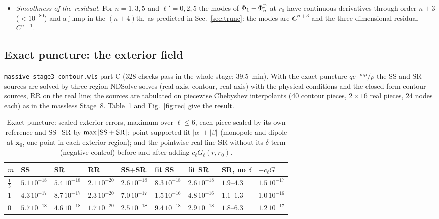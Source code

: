 \documentclass[11pt,a4paper]{article}
\newcommand{\x}{\mathbf{x}}
\newcommand{\code}[1]{\texttt{#1}}
\newcommand{\PhiP}{\Phi^{\rm P}}
\begin{document}
\begin{itemize}[leftmargin=*]
\item \emph{Smoothness of the residual.} For $n=1,3,5$ and $\ell'=0,2,5$ the modes of $\Phi_1-\PhiP_n$ at $r_0$ have continuous derivatives through order $n+3$ ($<10^{-80}$) and a jump in the $(n+4)$th, as predicted in Sec.~\ref{sec:trunc}: the modes are $C^{n+3}$ and the three-dimensional residual $C^{n+1}$.
\end{itemize}

\subsection{Exact puncture: the exterior field}\label{sec:exact}
\code{massive\_stage3\_\allowbreak contour.wls} part C (328 checks pass in the whole stage; 39.5~min).
With the exact puncture $qe^{-m\rho}/\rho$ the SS and SR sources are solved by three-region NDSolve solves (real axis, contour, real axis) with the physical conditions and the closed-form contour sources, RR on the real line; the sources are tabulated on piecewise Chebyshev interpolants (40 contour pieces, $2\times16$ real pieces, 24 nodes each) as in the massless Stage~8.
Table~\ref{tab:exact} and Fig.~\ref{fig:rec} give the result.

\begin{table}[h]
\centering
\caption{Exact puncture: scaled exterior errors, maximum over $\ell\le6$, each piece scaled by its own reference and SS$+$SR by $\max|{\rm SS}+{\rm SR}|$; point-supported fit $|\alpha|+|\beta|$ (monopole and dipole at $\x_0$, one point in each exterior region); and the pointwise real-line SR without its $\delta$ term (negative control) before and after adding $c_\ell G_\ell(r,r_0)$.}
\label{tab:exact}
\footnotesize
\begin{tabular}{lllllllll}
\toprule
$m$ & SS & SR & RR & SS$+$SR & fit SS & fit SR & SR, no $\delta$ & $+c_\ell G$\\
\midrule
$\tfrac15$ & $5.1\,10^{-18}$ & $5.4\,10^{-18}$ & $2.1\,10^{-20}$ & $2.6\,10^{-18}$ & $8.3\,10^{-18}$ & $2.6\,10^{-18}$ & $1.9$--$4.3$ & $1.5\,10^{-17}$\\
$1$ & $4.3\,10^{-17}$ & $8.7\,10^{-17}$ & $2.3\,10^{-20}$ & $7.0\,10^{-17}$ & $1.5\,10^{-16}$ & $4.8\,10^{-16}$ & $1.1$--$1.3$ & $1.0\,10^{-16}$\\
$0$ & $5.7\,10^{-18}$ & $4.6\,10^{-18}$ & $1.7\,10^{-20}$ & $2.5\,10^{-18}$ & $9.4\,10^{-18}$ & $2.9\,10^{-18}$ & $1.8$--$6.3$ & $1.2\,10^{-17}$\\
\bottomrule
\end{tabular}
\end{table}
\end{document}

